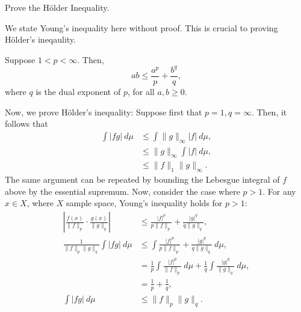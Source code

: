 \begin{problem}{12}
Prove the Hölder Inequality.
\end{problem}
\begin{solution}
    We state Young's inequality here without proof. This is crucial to proving Hölder's ineqaulity.
    \begin{theorem}
        Suppose $1 < p < \infty$. Then, 
        \[
            ab \leq \frac{a^p}{p} + \frac{b^{q}}{q},  
        \]
        where $q$ is the dual exponent of $p$, for all $a, b \geq 0$.
    \end{theorem}
    Now, we prove Hölder's inequality:
    Suppose first that $p=1,q=\infty$. Then, it follows that 
    \begin{align*}
        \int |fg|~d\mu &\leq \int \lVert g \rVert_\infty |f|~d\mu, \\
        &\leq \lVert g \rVert_\infty  \int |f|~d\mu, \\
        &\leq \lVert f \rVert_1 \lVert g \rVert_\infty.
    \end{align*}
    The same argument can be repeated by bounding the Lebesgue integral of $f$ above by the essential supremum. Now, consider the case where $p > 1$. For any $x\in X$, where $X$ sample space, Young's inequality holds for $p > 1$: 
    \begin{align*}
        \left| \frac{f(x)}{\lVert f \rVert_p} \cdot \frac{g(x)}{\lVert g \rVert_q} \right| &\leq \frac{|f|^p}{p\lVert f\rVert_p} + \frac{|g|^q}{q\lVert g\rVert_q}, \\
        \frac{1}{\lVert f\rVert_p \lVert g \rVert_q}\int |fg|~d\mu &\leq \int \frac{|f|^p}{p\lVert f\rVert_p} + \frac{|g|^q}{q\lVert g\rVert_q}~d\mu, \\
        &= \frac{1}{p} \int \frac{|f|^p}{\lVert f\rVert_p}~d\mu + \frac{1}{q} \int \frac{|g|^q}{\lVert g\rVert_q}~d\mu, \\
        &= \frac{1}{p} + \frac{1}{q}, \\
        \int |fg|~d\mu &\leq \lVert f \rVert_p \lVert g \rVert_q.
    \end{align*}
\end{solution}

\begin{problem}{13}
\end{problem}
\begin{solution}
\end{solution}